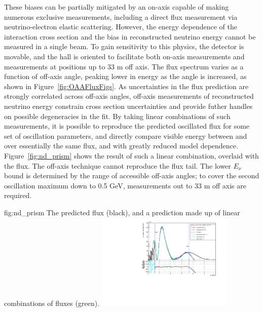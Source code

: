 These biases can be partially mitigated by an on-axis  capable of making numerous exclusive measurements, including a direct flux measurement via neutrino-electron elastic scattering. However, the energy dependence of the interaction cross section and the bias in reconstructed neutrino energy cannot be measured in a single beam. To gain sensitivity to this physics, the  detector is movable, and the  hall is oriented to facilitate both on-axis measurements and measurements at positions up to 33 m off axis. The flux spectrum varies as a function of off-axis angle, peaking lower in energy as the angle is increased, as shown in Figure~\ref{fig:OAAFluxFigs}. As uncertainties in the flux prediction are strongly correlated across off-axis angles, off-axis measurements of reconstructed neutrino energy constrain cross section uncertainties and provide futher handles on possible degeneracies in the fit. By taking linear combinations of such measurements, it is possible to reproduce the predicted  oscillated flux for some set of oscillation parameters, and directly compare visible energy between  and  over essentially the same flux, and with greatly reduced model dependence. Figure~\ref{fig:nd_prism} shows the result of such a linear combination, overlaid with the  flux. The off-axis technique cannot reproduce the  flux tail. The lower $E_{\nu}$ bound is determined by the range of accessible off-axis angles; to cover the second oscillation maximum down to 0.5 GeV, measurements out to 33 m off axis are required.

\begin{dunefigure}{fig:nd_prism}
{The predicted  flux (black), and a prediction made up of linear combinations of  fluxes (green).}
 \includegraphics[width=0.49\textwidth]{graphics/nuprism_coef_oscSpectrum_0_0022_0_5.pdf}
\end{dunefigure}

